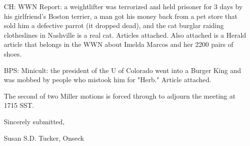 \documentclass[12pt]{article}
\begin{document}
CH: WWN Report: a weightlifter was terrorized and held prisoner for 3 days by his girlfriend's Boston terrier, a man got his money back from a pet store that sold him a defective parrot (it dropped dead), and the cat burglar raiding clotheslines in Nashville is a real cat. Articles attached. Also attached is a Herald article that belongs in the WWN about Imelda Marcos and her 2200 pairs of shoes.

BPS: Minicult: the president of the U of Colorado went into a Burger King and was mobbed by people who mistook him for "Herb." Article attached.

\vspace{12pt}

\noindent
The second of two Miller motions is forced through to adjourn the meeting at 1715 SST.

\vspace{18pt}

\centerline{Sincerely submitted,}
\centerline{Susan S.D. Tucker, Onseck}
\end{document}
